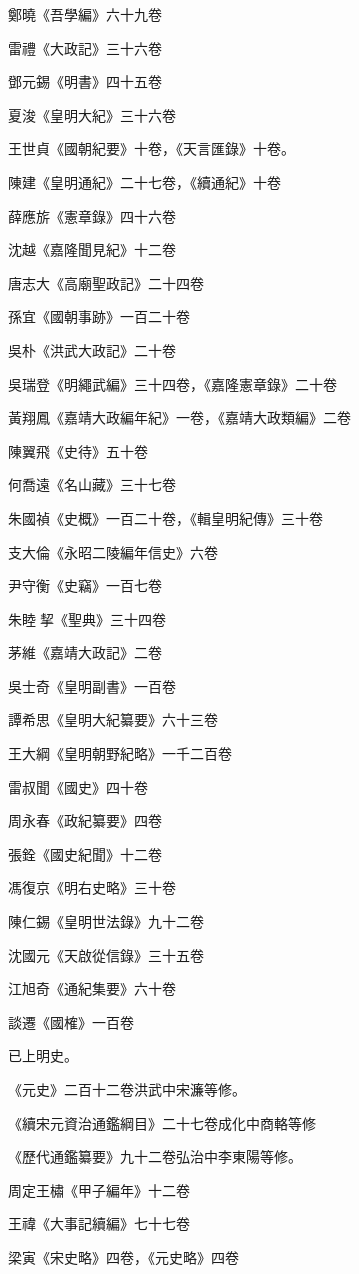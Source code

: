 鄭曉《吾學編》六十九卷

雷禮《大政記》三十六卷

鄧元錫《明書》四十五卷

夏浚《皇明大紀》三十六卷

王世貞《國朝紀要》十卷，《天言匯錄》十卷。

陳建《皇明通紀》二十七卷，《續通紀》十卷

薛應旂《憲章錄》四十六卷

沈越《嘉隆聞見紀》十二卷

唐志大《高廟聖政記》二十四卷

孫宜《國朝事跡》一百二十卷

吳朴《洪武大政記》二十卷

吳瑞登《明繩武編》三十四卷，《嘉隆憲章錄》二十卷

黃翔鳳《嘉靖大政編年紀》一卷，《嘉靖大政類編》二卷

陳翼飛《史待》五十卷

何喬遠《名山藏》三十七卷

朱國禎《史概》一百二十卷，《輯皇明紀傳》三十卷

支大倫《永昭二陵編年信史》六卷

尹守衡《史竊》一百七卷

朱睦挈《聖典》三十四卷

茅維《嘉靖大政記》二卷

吳士奇《皇明副書》一百卷

譚希思《皇明大紀纂要》六十三卷

王大綱《皇明朝野紀略》一千二百卷

雷叔聞《國史》四十卷

周永春《政紀纂要》四卷

張銓《國史紀聞》十二卷

馮復京《明右史略》三十卷

陳仁錫《皇明世法錄》九十二卷

沈國元《天啟從信錄》三十五卷

江旭奇《通紀集要》六十卷

談遷《國榷》一百卷

已上明史。

《元史》二百十二卷洪武中宋濂等修。

《續宋元資治通鑑綱目》二十七卷成化中商輅等修

《歷代通鑑纂要》九十二卷弘治中李東陽等修。

周定王橚《甲子編年》十二卷

王禕《大事記續編》七十七卷

梁寅《宋史略》四卷，《元史略》四卷

